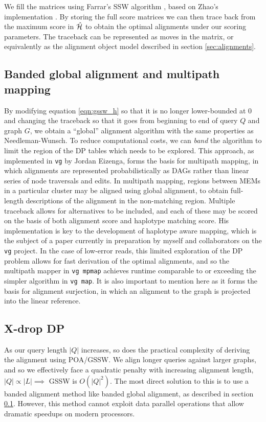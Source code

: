 We fill the matrices using Farrar's SSW algorithm \cite{farrar2007striped}, based on Zhao's implementation \cite{zhao2013ssw}.
By storing the full score matrices we can then trace back from the maximum score in $\hat{\cal H}$ to obtain the optimal alignments under our scoring parameters.
The traceback can be represented as moves in the matrix, or equivalently as the alignment object model described in section \ref{sec:alignments}.

\subsection{Banded global alignment and multipath mapping}
\label{sec:banded_global}

By modifying equation \ref{eqn:gssw_h} so that it is no longer lower-bounded at 0 and changing the traceback so that it goes from beginning to end of query $Q$ and graph $G$, we obtain a ``global'' alignment algorithm with the same properties as Needleman-Wunsch.
To reduce computational costs, we can \emph{band} the algorithm to limit the region of the DP tables which needs to be explored.
This approach, as implemented in {\tt vg} by Jordan Eizenga, forms the basis for multipath mapping, in which alignments are represented probabilistically as DAGs rather than linear series of node traversals and edits.
In multipath mapping, regions between MEMs in a particular cluster may be aligned using global alignment, to obtain full-length descriptions of the alignment in the non-matching region.
Multiple traceback allows for alternatives to be included, and each of these may be scored on the basis of both alignment score and haplotype matching score.
His implementation is key to the development of haplotype aware mapping, which is the subject of a paper currently in preparation by myself and collaborators on the {\tt vg} project.
In the case of low-error reads, this limited exploration of the DP problem allows for fast derivation of the optimal alignments, and so the multipath mapper in {\tt vg mpmap} achieves runtime comparable to or exceeding the simpler algorithm in {\tt vg map}.
It is also important to mention here as it forms the basis for alignment surjection, in which an alignment to the graph is projected into the linear reference.

\subsection{X-drop DP}

As our query length $|Q|$ increases, so does the practical complexity of deriving the alignment using POA/GSSW.
We align longer queries against larger graphs, and so we effectively face a quadratic penalty with increasing alignment length, $|Q| \propto |L| \implies$ GSSW is $O(|Q|^2)$.
The most direct solution to this is to use a banded alignment method like banded global alignment, as described in section \ref{sec:banded_global}.
However, this method cannot exploit data parallel operations that allow dramatic speedups on modern processors.

